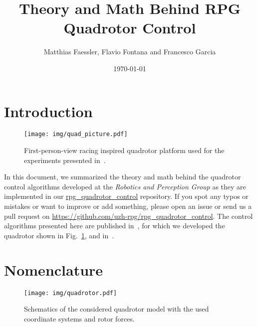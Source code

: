 \documentclass[10pt,a4paper,fleqn]{article}
\title{Theory and Math Behind RPG Quadrotor Control}
\author{
  Matthias Faessler, Flavio Fontana and Francesco Garcia
}
\date{\today}
\begin{document}
\pagestyle{fancy}             %

\maketitle
\tableofcontents
\newpage


\section{Introduction}

\begin{figure}[t]
   \centering
   \texttt{[image: img/quad\_picture.pdf]}
   \caption{First-person-view racing inspired quadrotor platform used for the experiments presented in~\cite{Faessler18ral}.}
   \label{fig:quad_picture}
\end{figure}

In this document, we summarized the theory and math behind the quadrotor control algorithms developed at the \emph{Robotics and Perception Group} as they are implemented in our \href{https://github.com/uzh-rpg/rpg_quadrotor_control}{rpg\_quadrotor\_control} repository.
If you spot any typos or mistakes or want to improve or add something, please open an issue or send us a pull request on \url{https://github.com/uzh-rpg/rpg_quadrotor_control}.
The control algorithms presented here are published in~\cite{Faessler18ral}, for which we developed the quadrotor shown in Fig.~\ref{fig:quad_picture}, and in~\cite{Faessler17ral}.

\section{Nomenclature} \label{sec:nomenclature}

\begin{figure}[h]
   \centering
   \texttt{[image: img/quadrotor.pdf]}
   \caption{Schematics of the considered quadrotor model with the used coordinate systems and rotor forces.}
   \label{fig:quad}
\end{figure}
\end{document}
